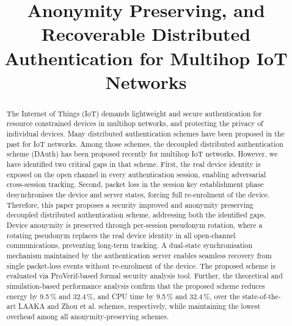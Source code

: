 \documentclass[conference]{IEEEtran}
\begin{document}
\title{Anonymity Preserving, and Recoverable Distributed\\Authentication for Multihop IoT Networks}

\author{
  
}

\maketitle

\begin{abstract}
The Internet of Things (IoT) demands lightweight and secure authentication
for resource constrained devices in multihop networks, and protecting the
privacy of individual devices.  Many distributed authentication schemes have
been proposed in the past for IoT networks. Among those schemes, the decoupled
distributed authentication scheme (DAuth) has been
proposed recently for multihop IoT networks. However, we have identified
two critical gaps in that scheme. First, the real device identity is exposed on the open
channel in every authentication session, enabling adversarial cross-session
tracking. Second, packet loss in the session key establishment phase desynchronises
the device and server states, forcing full re-enrolment of the device. Therefore, this paper proposes a security improved and anonymity preserving decoupled distributed authentication scheme,
addressing both the identified gaps. Device anonymity is preserved through per-session
pseudonym rotation, where a rotating pseudonym replaces the real device identity
in all open-channel communications, preventing long-term tracking.  A
dual-state synchronisation mechanism maintained by the authentication
server enables seamless recovery from single packet-loss
events without re-enrolment of the device. The proposed scheme is evaluated via ProVerif-based
formal security analysis tool. Further, the theoretical and simulation-based performance analysis confirm that the proposed scheme reduces energy by
9.5\,\% and 32.4\,\%, and CPU time by 9.5\,\% and 32.4\,\%, over the state-of-the-art
LAAKA and Zhou et al. schemes, respectively, while maintaining the lowest overhead among all
anonymity-preserving schemes.
\end{abstract}
\end{document}
